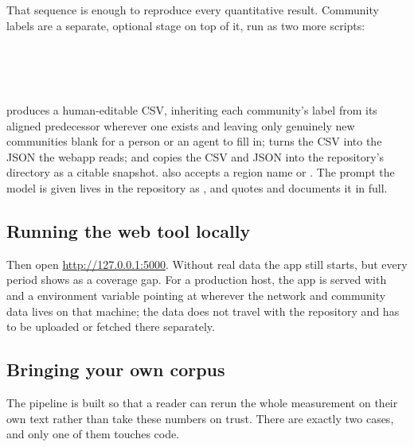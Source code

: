 \documentclass[11pt]{article}
\begin{document}
That sequence is enough to reproduce every quantitative result. Community
labels are a separate, optional stage on top of it, run as two more
scripts:

\begin{dobox}
\\
\\
\\
\end{dobox}

 produces a human-editable CSV, inheriting each
community's label from its aligned predecessor wherever one exists and
leaving only genuinely new communities blank for a person or an agent to
fill in;  turns the CSV into the JSON the webapp reads; and
 copies the CSV and JSON into the repository's
 directory as a citable snapshot.  also
accepts a region name or . The prompt the model is given lives
in the repository as , and
 quotes and documents it in full.

\subsection{Running the web tool locally}

\begin{dobox}
\end{dobox}

Then open \url{http://127.0.0.1:5000}. Without real data the app still
starts, but every period shows as a coverage gap. For a production host,
the app is served with  and a 
environment variable pointing at wherever the network and community data
lives on that machine; the data does not travel with the repository and
has to be uploaded or fetched there separately.

\subsection{Bringing your own corpus}
\label{sec:byoc}

The pipeline is built so that a reader can rerun the whole measurement on
their own text rather than take these numbers on trust. There are exactly
two cases, and only one of them touches code.
\end{document}
